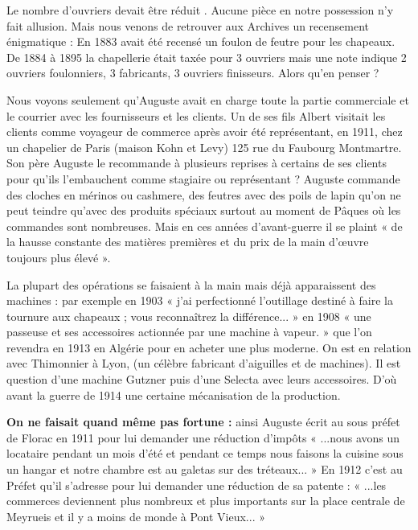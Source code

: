 
Le nombre d’ouvriers devait être réduit . Aucune pièce en notre possession n’y fait allusion.
Mais nous venons de retrouver aux Archives un recensement énigmatique :
En 1883 avait été recensé un foulon de feutre pour les chapeaux.
De 1884 à 1895 la chapellerie était taxée pour 3 ouvriers mais une note indique 2 ouvriers
foulonniers, 3 fabricants, 3 ouvriers finisseurs. Alors qu’en penser ?

Nous voyons seulement qu’Auguste avait en charge toute la partie commerciale et le courrier
avec les fournisseurs et les clients. Un de ses fils Albert visitait les clients comme voyageur de
commerce après avoir été représentant, en 1911, chez un chapelier de Paris (maison Kohn et
Levy) 125 rue du Faubourg Montmartre. Son père Auguste le recommande à plusieurs
reprises à certains de ses clients pour qu’ils l’embauchent comme stagiaire ou représentant ?
Auguste commande des cloches en mérinos ou cashmere, des feutres avec des poils de lapin
qu’on ne peut teindre qu’avec des produits spéciaux surtout au moment de Pâques où les
commandes sont nombreuses.
Mais en ces années d’avant-guerre il se plaint « de la hausse constante des matières premières
et du prix de la main d’œuvre toujours plus élevé ».

La plupart des opérations se faisaient à la main mais déjà apparaissent des machines : par
exemple en 1903 « j’ai perfectionné l’outillage destiné à faire la tournure aux chapeaux ;
vous reconnaîtrez la différence... » en 1908 « une passeuse et ses accessoires actionnée par
une machine à vapeur. » que l’on revendra en 1913 en Algérie pour en acheter une plus
moderne. On est en relation avec Thimonnier à Lyon, (un célèbre fabricant d’aiguilles et de
machines). Il est question d’une machine Gutzner puis d’une Selecta avec leurs accessoires.
D’où avant la guerre de 1914 une certaine mécanisation de la production.

\textbf{On ne faisait quand même pas fortune :} ainsi Auguste écrit au sous préfet de Florac en
1911 pour lui demander une réduction d’impôts « ...nous avons un locataire pendant un mois
d’été et pendant ce temps nous faisons la cuisine sous un hangar et notre chambre est au
galetas sur des tréteaux... »
En 1912 c’est au Préfet qu’il s’adresse pour lui demander une réduction de sa patente : « ...les
commerces deviennent plus nombreux et plus importants sur la place centrale de Meyrueis et
il y a moins de monde à Pont Vieux... »

